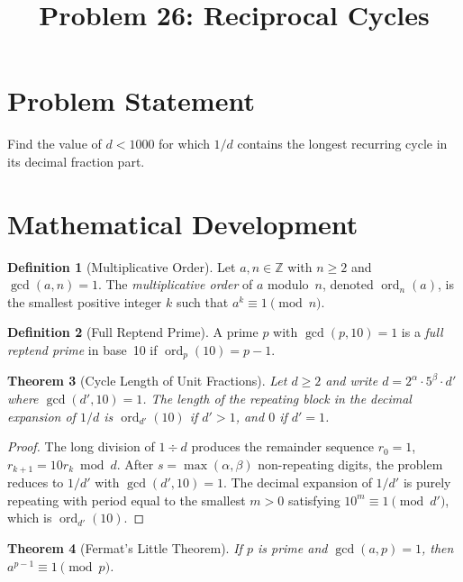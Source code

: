 \documentclass[12pt,a4paper]{article}
\title{Problem 26: Reciprocal Cycles}
\author{}
\date{}
\newtheorem{theorem}{Theorem}
\theoremstyle{definition}
\newtheorem{definition}[theorem]{Definition}
\begin{document}
\maketitle

\section{Problem Statement}

Find the value of $d < 1000$ for which $1/d$ contains the longest recurring cycle in its decimal fraction part.

\section{Mathematical Development}

\begin{definition}[Multiplicative Order]
Let $a, n \in \mathbb{Z}$ with $n \geq 2$ and $\gcd(a, n) = 1$. The \emph{multiplicative order} of $a$ modulo~$n$, denoted $\operatorname{ord}_n(a)$, is the smallest positive integer $k$ such that $a^k \equiv 1 \pmod{n}$.
\end{definition}

\begin{definition}[Full Reptend Prime]
A prime $p$ with $\gcd(p, 10) = 1$ is a \emph{full reptend prime} in base~10 if $\operatorname{ord}_p(10) = p - 1$.
\end{definition}

\begin{theorem}[Cycle Length of Unit Fractions]\label{thm:cycle}
Let $d \geq 2$ and write $d = 2^\alpha \cdot 5^\beta \cdot d'$ where $\gcd(d', 10) = 1$. The length of the repeating block in the decimal expansion of $1/d$ is $\operatorname{ord}_{d'}(10)$ if $d' > 1$, and $0$ if $d' = 1$.
\end{theorem}

\begin{proof}
The long division of $1 \div d$ produces the remainder sequence $r_0 = 1$, $r_{k+1} = 10 r_k \bmod d$. After $s = \max(\alpha, \beta)$ non-repeating digits, the problem reduces to $1/d'$ with $\gcd(d', 10) = 1$. The decimal expansion of $1/d'$ is purely repeating with period equal to the smallest $m > 0$ satisfying $10^m \equiv 1 \pmod{d'}$, which is $\operatorname{ord}_{d'}(10)$.
\end{proof}

\begin{theorem}[Fermat's Little Theorem]\label{thm:fermat}
If $p$ is prime and $\gcd(a, p) = 1$, then $a^{p-1} \equiv 1 \pmod{p}$.
\end{theorem}
\end{document}
